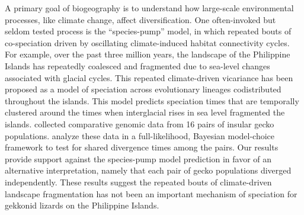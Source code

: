A primary goal of biogeography is to understand how large-scale environmental
processes, like climate change, affect diversification.
One often-invoked but seldom tested process is the  ``species-pump''
model, in which repeated bouts of co-speciation  driven by oscillating
climate-induced habitat connectivity cycles.
For example, over the past three million years, the landscape of the Philippine
Islands has repeatedly coalesced and fragmented due to sea-level changes
associated with  glacial cycles.
This repeated climate-driven vicariance has been proposed as a model of
speciation across evolutionary lineages codistributed throughout the islands.
This model predicts speciation times that are temporally clustered around
the times when interglacial rises in sea level fragmented the islands.
 collected comparative genomic data from 16 pairs of insular gecko populations.
 analyze these data in a full-likelihood, Bayesian model-choice
framework to test for shared divergence times among the pairs.
Our results provide support against the species-pump model prediction in favor
of an alternative interpretation, namely that each pair of gecko populations
diverged independently.
These results suggest the repeated bouts of climate-driven landscape
fragmentation has not been an important mechanism of speciation for
gekkonid lizards on the Philippine Islands.
